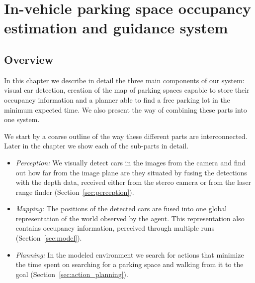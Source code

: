
\newcommand\Bx{x}
\newcommand\Bm{m}
\def\v{\vm{v}}
\newcommand\vm[1]{\bm{\mathrm{#1}}}
\renewcommand{\v}{{\mbox{a}^i}}
\newcommand{\z}{z_{t}}
\newcommand{\y}{z_{1:t-1}}

\chapter{In-vehicle parking space occupancy estimation and guidance system}
\label{cha:our_approach}

\section{Overview} %
\label{sec:overview}

In this chapter we describe in detail the three main components of our system:
visual car detection, creation of the map of parking spaces capable to store
their occupancy information and a planner able to find a free parking lot in
the minimum expected time. We also present the way of combining these parts
into one system.

We start by a coarse outline of the way these different parts are
interconnected. Later in the chapter we show each of the sub-parts in detail.

\begin{itemize}

\item \emph{Perception:} We visually detect cars in the images from the camera and find out how far from the image plane are they situated by fusing the detections with the depth data, received either from the stereo camera or from the laser range finder (Section~\ref{sec:perception}).

\item \emph{Mapping:} The positions of the detected cars are fused into one global representation of the world observed by the agent. This representation also contains occupancy information, perceived through multiple runs (Section~\ref{sec:model}).

\item \emph{Planning:} In the modeled environment we search for actions that minimize the time spent on searching for a parking space and walking from it to the goal (Section~\ref{sec:action_planning}).

\end{itemize}


